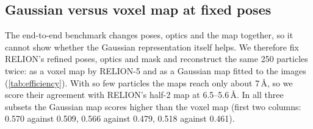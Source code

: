 



\subsection{Gaussian versus voxel map at fixed poses}
\label{sec:results:efficiency}



The end-to-end benchmark changes poses, optics and the map together, so it cannot show whether the Gaussian representation itself helps.
We therefore fix RELION's refined poses, optics and mask and reconstruct the same 250 particles twice: as a voxel map by RELION-5 and as a Gaussian map fitted to the images (\cref{tab:efficiency}).
With so few particles the maps reach only about 7\,\AA, so we score their agreement with RELION's half-2 map at 6.5--5.6\,\AA.
In all three subsets the Gaussian map scores higher than the voxel map (first two columns: 0.570 against 0.509, 0.566 against 0.479, 0.518 against 0.461).

